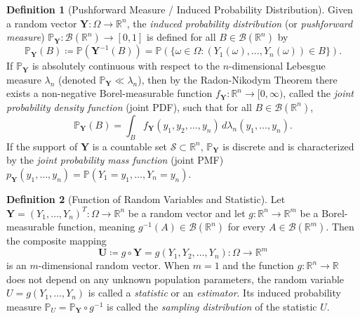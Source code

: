 \documentclass[11pt, letterpaper]{article}
\theoremstyle{definition}
\newtheorem{definition}{Definition}[section]
\theoremstyle{remark}
\newcommand{\R}{\mathbb{R}}
\newcommand{\Prob}{\mathbb{P}}
\begin{document}
\begin{definition}[Pushforward Measure / Induced Probability Distribution]
Given a random vector $\mathbf{Y} : \Omega \to \R^n$, the \emph{induced probability distribution} (or \emph{pushforward measure}) $\Prob_{\mathbf{Y}} : \mathcal{B}(\R^n) \to [0, 1]$ is defined for all $B \in \mathcal{B}(\R^n)$ by
\[
    \Prob_{\mathbf{Y}}(B) \coloneqq \Prob\left(\mathbf{Y}^{-1}(B)\right) = \Prob\left(\{\omega \in \Omega : (Y_1(\omega), \dots, Y_n(\omega)) \in B\}\right).
\]
If $\Prob_{\mathbf{Y}}$ is absolutely continuous with respect to the $n$-dimensional Lebesgue measure $\lambda_n$ (denoted $\Prob_{\mathbf{Y}} \ll \lambda_n$), then by the Radon-Nikodym Theorem there exists a non-negative Borel-measurable function $f_{\mathbf{Y}} : \R^n \to [0, \infty)$, called the \emph{joint probability density function} (joint PDF), such that for all $B \in \mathcal{B}(\R^n)$,
\[
    \Prob_{\mathbf{Y}}(B) = \int_{B} f_{\mathbf{Y}}(y_1, y_2, \dots, y_n) \, d\lambda_n(y_1, \dots, y_n).
\]
If the support of $\mathbf{Y}$ is a countable set $\mathcal{S} \subset \R^n$, $\Prob_{\mathbf{Y}}$ is discrete and is characterized by the \emph{joint probability mass function} (joint PMF) $p_{\mathbf{Y}}(y_1, \dots, y_n) = \Prob(Y_1 = y_1, \dots, Y_n = y_n)$.
\end{definition}

\begin{definition}[Function of Random Variables and Statistic]
Let $\mathbf{Y} = (Y_1, \dots, Y_n)^T : \Omega \to \R^n$ be a random vector and let $g : \R^n \to \R^m$ be a Borel-measurable function, meaning $g^{-1}(A) \in \mathcal{B}(\R^n)$ for every $A \in \mathcal{B}(\R^m)$. Then the composite mapping
\[
    \mathbf{U} \coloneqq g \circ \mathbf{Y} = g(Y_1, Y_2, \dots, Y_n) : \Omega \to \R^m
\]
is an $m$-dimensional random vector. When $m=1$ and the function $g : \R^n \to \R$ does not depend on any unknown population parameters, the random variable $U = g(Y_1, \dots, Y_n)$ is called a \emph{statistic} or an \emph{estimator}. Its induced probability measure $\Prob_U = \Prob_{\mathbf{Y}} \circ g^{-1}$ is called the \emph{sampling distribution} of the statistic $U$.
\end{definition}
\end{document}
